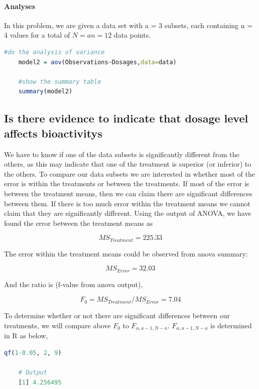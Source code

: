 \documentclass[11pt]{article}
\begin{document}
\paragraph{Analyses}
In this problem, we are given a data set with a = 3 subsets, each containing n = 4 values for a total of $\displaystyle N=an=12$ data points. 

\begin{lstlisting}[language=R]
    #do the analysis of variance
    model2 = aov(Observations~Dosages,data=data)

    #show the summary table
    summary(model2)
\end{lstlisting}



\subsection{Is there evidence to indicate that dosage level affects bioactivitys}
We have to know if one of the data subsets is significantly different from the others, as this may indicate that one of the treatment is superior (or inferior) to the others. To compare our data subsets we are interested in whether most of the error is within the treatments or between the treatments. If most of the error is between the treatment means, then we can claim there are significant differences between them. If there is too much error within the treatment means we cannot claim that they are significantly different. Using the output of ANOVA, we have found the error between the treatment means as 

$$\displaystyle MS_{Treatment} = 225.33$$

The error within the treatment means could be observed from anova summary: 

$$\displaystyle MS_{Error} = 32.03$$

And the ratio is (f-value from anova output),

$$\displaystyle F_0 = MS_{Treatment}/MS_{Error} = 7.04$$

To determine whether or not there are significant differences between our treatments, we will compare above $\displaystyle F_0$ to $\displaystyle F_{\alpha, a-1, N-a}$. $\displaystyle F_{\alpha, a-1, N-a}$ is determined in R as below,

\begin{lstlisting}[language=R]
    qf(1-0.05, 2, 9)   

    # Output
    [1] 4.256495
\end{lstlisting}
\end{document}
